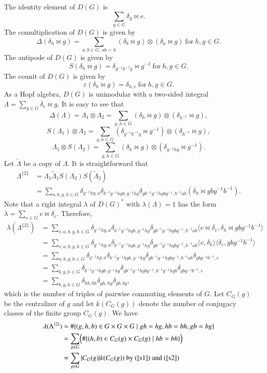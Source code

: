 \documentclass[11pt]{amsart}
\numberwithin{equation}{section}
\begin{document}
The identity element of $D(G)$ is
\[
\sum_{g \in G} \delta_g\bowtie e.
\]
The comultiplication of $D(G)$ is given by
\[
\Delta(\delta_h\bowtie  g) = \sum_{a, b \in G, \, ab = h} (\delta_b\bowtie  g) \otimes (\delta_a\bowtie  g)\ \text{for}\ h,g\in G.
\]
The antipode of $D(G)$ is given by
\[
S(\delta_h\bowtie  g)= \delta_{g^{-1}h^{-1}g}\bowtie g^{-1}\ \text{for}\ h,g\in G.
\]
The counit of  $D(G)$ is given by
\[
\varepsilon(\delta_h \bowtie  g) = \delta_{h,e}\ \text{for}\ h,g\in G.
\]
As a Hopf algebra, $D(G)$ is unimodular with a two-sided integral $\Lambda=\sum_{g\in G}\delta_e\bowtie g$. It is easy to see that
$$\Delta(\Lambda)=\Lambda_1\otimes\Lambda_2=\sum_{g,h\in G}(\delta_h\bowtie g)\otimes(\delta_{h^{-1}}\bowtie g),$$
$$S(\Lambda_1)\otimes\Lambda_2=\sum_{g,h\in G}(\delta_{g^{-1}h^{-1}g}\bowtie g^{-1})\otimes(\delta_{h^{-1}}\bowtie g),$$
$$\Lambda_1\otimes S(\Lambda_2)=\sum_{g,h\in G}(\delta_{h}\bowtie g)\otimes(\delta_{g^{-1}hg}\bowtie g^{-1}).$$
Let $\widetilde{\Lambda}$ be a copy of $\Lambda.$
It is straightforward that 
\begin{align*}\Lambda^{\{2\}}&=\Lambda_1\widetilde{\Lambda}_1S(\Lambda_2)S(\widetilde{\Lambda}_2)\\
&=\sum_{a,b,g,h\in G}\delta_{g^{-1}hg,a}\delta_{b^{-1}g^{-1}hgb,g^{-1}hg}\delta_{gb^{-1}g^{-1}hgbg^{-1},b^{-1}ab}(\delta_h\bowtie gbg^{-1}b^{-1}).
\end{align*}
Note that a right integral $\lambda$ of $D(G)^*$ with $\lambda(\Lambda)=1$ has the form  $\lambda=\sum_{v\in G}v\bowtie \delta_e$. Therefore,
\begin{align*}\lambda(\Lambda^{\{2\}})&=
\sum_{v,a,b,g,h\in G}\delta_{g^{-1}hg,a}\delta_{b^{-1}g^{-1}hgb,g^{-1}hg}\delta_{gb^{-1}g^{-1}hgbg^{-1},b^{-1}ab}\langle v\bowtie \delta_e,\delta_h\bowtie gbg^{-1}b^{-1}\rangle\\
&=\sum_{v,a,b,g,h\in G}\delta_{g^{-1}hg,a}\delta_{b^{-1}g^{-1}hgb,g^{-1}hg}\delta_{gb^{-1}g^{-1}hgbg^{-1},b^{-1}ab}\langle v,\delta_h\rangle\langle\delta_e, gbg^{-1}b^{-1}\rangle\\
&=\sum_{a,b,g,h\in G}\delta_{g^{-1}hg,a}\delta_{b^{-1}g^{-1}hgb,g^{-1}hg}\delta_{gb^{-1}g^{-1}hgbg^{-1},b^{-1}ab}\delta_{gbg^{-1}b^{-1},e}\\
&=\sum_{b,g,h\in G}\delta_{b^{-1}g^{-1}hgb,g^{-1}hg}\delta_{gb^{-1}g^{-1}hgbg^{-1},b^{-1}g^{-1}hgb}\delta_{gbg^{-1}b^{-1},e}\\
&=\sum_{b,g,h\in G}\delta_{hb,bh}\delta_{gh,hg}\delta_{gb,bg},
\end{align*} 
which is the number of triples of pairwise commuting elements of $G$.  
Let $C_G(g)$ be the centralizer of $g$  and let $k(C_G(g))$ denote the number of conjugacy classes of the finite group $C_G(g)$. We have
\begin{align*}\lambda(\Lambda^{\{2\}})&=\#\{(g,h,b)\in G\times G\times G\mid gh=hg,hb=bh,gb=bg\}\\
&=\sum_{g\in G}\Bigl(\#\{(h,b)\in C_G(g)\times C_G(g)\mid hb=bh\} \Bigl)\\
&=\sum_{g\in G}|C_G(g)|k(C_G(g))\ \text{by}\ (\ref{s1})\ \text{and}\ (\ref{s2})
\end{align*}
\end{document}
